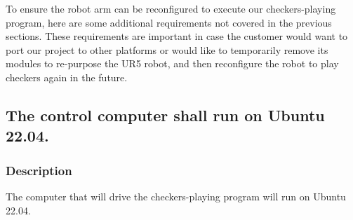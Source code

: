 

To ensure the robot arm can be reconfigured to execute our checkers-playing program, here are some additional requirements not covered in the previous sections. These requirements are important in case the customer would want to port our project to other platforms or would like to temporarily remove its modules to re-purpose the UR5 robot, and then reconfigure the robot to play checkers again in the future.

\subsection{The control computer shall run on Ubuntu 22.04.}
\subsubsection{Description}
The computer that will drive the checkers-playing program will run on Ubuntu 22.04.
